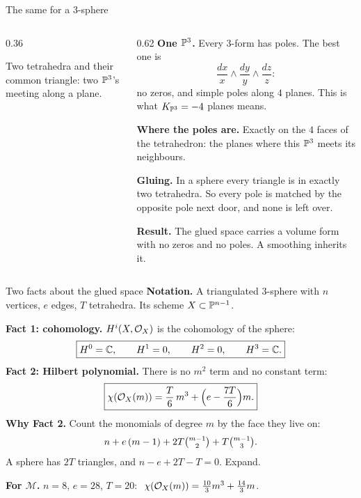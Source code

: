 \begin{frame}{The same for a \(3\)-sphere}
\begin{columns}[c]
\begin{column}{0.36\textwidth}\centering
{}
\par\smallskip
{\small Two tetrahedra and their common triangle: two \(\mathbb P^3\)'s meeting along a plane.}
\end{column}
\begin{column}{0.62\textwidth}
\textbf{One \(\mathbb P^3\).} Every \(3\)-form has poles. The best one is
\[
\frac{dx}{x}\wedge\frac{dy}{y}\wedge\frac{dz}{z}:
\]
no zeros, and simple poles along \(4\) planes. This is what \(K_{\mathbb P^3}=-4\) planes means.
\par\smallskip
\textbf{Where the poles are.} Exactly on the \(4\) faces of the tetrahedron: the planes where this \(\mathbb P^3\) meets its neighbours.
\par\smallskip
\textbf{Gluing.} In a sphere every triangle is in exactly two tetrahedra. So every pole is matched by the opposite pole next door, and none is left over.
\par\smallskip
\textbf{Result.} The glued space carries a volume form with no zeros and no poles. A smoothing inherits it.
\end{column}
\end{columns}
\end{frame}

\begin{frame}{Two facts about the glued space}
\textbf{Notation.} A triangulated \(3\)-sphere with \(n\) vertices, \(e\) edges, \(T\) tetrahedra. Its scheme \(X\subset\mathbb P^{n-1}\).
\par
\textbf{Fact 1: cohomology.} \(H^i(X,\mathcal O_X)\) is the cohomology of the sphere:
\[
\boxed{H^0=\mathbb C,\qquad H^1=0,\qquad H^2=0,\qquad H^3=\mathbb C.}
\]
\textbf{Fact 2: Hilbert polynomial.} There is no \(m^2\) term and no constant term:
\[
\boxed{\chi(\mathcal O_X(m))=\frac T6\,m^3+\Bigl(e-\frac{7T}6\Bigr)m.}
\]
\textbf{Why Fact 2.} Count the monomials of degree \(m\) by the face they live on:
\[
n+e\,(m-1)+2T\tbinom{m-1}2+T\tbinom{m-1}3 .
\]
A sphere has \(2T\) triangles, and \(n-e+2T-T=0\). Expand.
\par
\textbf{For \(\mathcal M\).} \(n=8\), \(e=28\), \(T=20\): \(\ \chi(\cO_X(m))=\tfrac{10}3m^3+\tfrac{14}3m\).
\end{frame}

